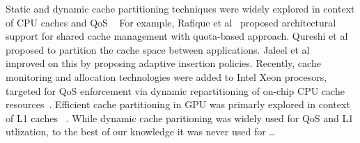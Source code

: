 Static and dynamic cache partitioning techniques were widely explored in
context of CPU caches and QoS
~\cite{ics2007,Herdrich2016CacheQF,pact06,qureshi-micro,jaleel-pact} For
example, Rafique et al~\cite{pact06} proposed architectural support for shared
cache management with quota-based approach. Qureshi et al~\cite{qureshi-micro}
proposed to partition the cache space between applications. Jaleel et
al~\cite{jaleel-pact} improved on this by proposing adaptive insertion
policies. Recently, cache monitoring and allocation technologies were added to
Intel Xeon procesors, targeted for QoS enforcement via dynamic repartitioning
of on-chip CPU cache resources~\cite{Herdrich2016CacheQF}.  Efficient cache
partitioning in GPU was primarly explored in context of L1 caches
~\cite{li-priority-based}. While dynamic cache paritioning was widely used for
QoS and L1 utlization, to the best of our knowledge it was never used for
\ldots





